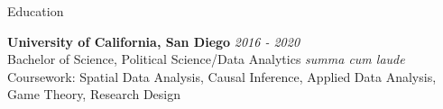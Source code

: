 \documentclass[10pt]{resume} %
\begin{document}
	
	
	\begin{rSection}{Education}
		
		{\bf University of California, San Diego} \hfill {\em 2016 - 2020} 
		\\ Bachelor of Science, Political Science/Data Analytics \hfill {\em summa cum laude}
		\\ Coursework: Spatial Data Analysis, Causal Inference, Applied Data Analysis, Game Theory, Research Design
		
	\end{rSection}
	
	
\end{document}
